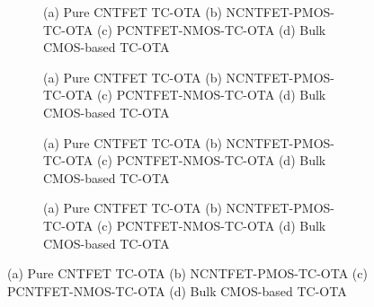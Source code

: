 \begin{figure}[htbp]
  \centering
  \begin{subfigure}[b]{0.23\linewidth}
    \centering
    \caption{(a) Pure CNTFET TC-OTA (b) NCNTFET-PMOS-TC-OTA (c) PCNTFET-NMOS-TC-OTA (d) Bulk CMOS-based TC-OTA}

  \end{subfigure}
  \hfill
  \begin{subfigure}[b]{0.23\linewidth}
    \centering
    \caption{(a) Pure CNTFET TC-OTA (b) NCNTFET-PMOS-TC-OTA (c) PCNTFET-NMOS-TC-OTA (d) Bulk CMOS-based TC-OTA}

  \end{subfigure}
  \hfill
  \begin{subfigure}[b]{0.23\linewidth}
    \centering
    \caption{(a) Pure CNTFET TC-OTA (b) NCNTFET-PMOS-TC-OTA (c) PCNTFET-NMOS-TC-OTA (d) Bulk CMOS-based TC-OTA}

  \end{subfigure}
  \hfill
  \begin{subfigure}[b]{0.23\linewidth}
    \centering
    \caption{(a) Pure CNTFET TC-OTA (b) NCNTFET-PMOS-TC-OTA (c) PCNTFET-NMOS-TC-OTA (d) Bulk CMOS-based TC-OTA}

  \end{subfigure}
  \caption{(a) Pure CNTFET TC-OTA (b) NCNTFET-PMOS-TC-OTA (c) PCNTFET-NMOS-TC-OTA (d) Bulk CMOS-based TC-OTA}

  \label{fig:group_pgg2f}
\end{figure}

